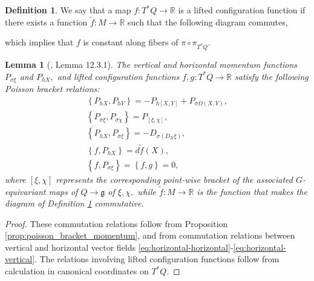 \documentclass[12pt, letterpaper, reqno]{amsart}
\theoremstyle{definition}
\newtheorem{df}{Definition}
\theoremstyle{plain}
\newtheorem{lm}{Lemma}
\theoremstyle{remark}
\begin{document}
\begin{df}\label{df:lifted_configuration_function}
	We say that a map $ f: T^*Q \rightarrow \mathbb{R} $ is a lifted configuration function if there exists a function $ \tilde f: M \rightarrow \mathbb{R} $ such that the following diagram commutes,
	\begin{center}
	\end{center}
	which implies that $ f $ is constant along fibers of $ \pi\circ \pi_{T^*Q}. $ 
\end{df}
\begin{lm}[\cite{montgomery2002tour}, Lemma 12.3.1]
	The vertical and horizontal momentum functions $ P_{\sigma\xi} $ and $ P_{hX}, $ and lifted configuration functions $ f,g: T^*Q \rightarrow \mathbb{R} $ satisfy the following Poisson bracket relations: 	
	\begin{align}
		\left\{ P_{hX}, P_{hY} \right\} = -P_{h[X,Y]}+P_{\sigma\Omega(X,Y)},\label{eq:lemma_1}\\ 
	\left\{ P_{\sigma \xi}, P_{\sigma\chi} \right\} = P_{[\xi, \chi]},\\
	\left\{ P_{hX}, P_{\sigma\xi} \right\} = -D_{\sigma(D_X\xi)},\\
	\left\{ f, P_{hX} \right\} = d\tilde f(X),\\ \label{eq:lemma_4}
	\left\{ f, P_{\sigma\xi} \right\} = \left\{ f,g \right\} =0,
	\end{align}
	where $\left[ \xi, \chi \right]$ 	represents the corresponding point-wise bracket of the associated $ G $-equivariant maps of $ Q \rightarrow \mathfrak{g} $ of $ \xi,\chi, $ while $ \tilde f : M \rightarrow \mathbb{R} $ is the function that makes the diagram of Definition \ref{df:lifted_configuration_function} commutative.
\end{lm}
\begin{proof}
	These commutation relations follow from Proposition \ref{prop:poisson_bracket_momentum}, and from commutation relations between vertical and horizontal vector fields \eqref{eq:horizontal-horizontal}-\eqref{eq:horizontal-vertical}. The relations involving lifted configuration functions follow from calculation in canonical coordinates on $ T^*Q. $ 
\end{proof}
\end{document}
